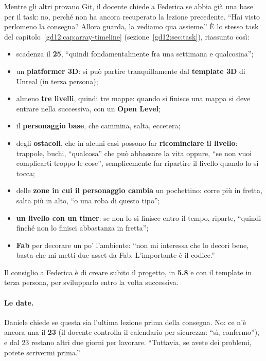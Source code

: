Mentre gli altri provano Git, il docente chiede a Federica se abbia già una base
per il task: no, perché non ha ancora recuperato la lezione precedente. ``Hai
visto perlomeno la consegna? Allora guarda, la vediamo qua assieme.'' È lo
stesso task del capitolo~\ref{gd12:cap:array-timeline}
(sezione~\ref{gd12:sec:task}), riassunto così:
\begin{itemize}
  \item scadenza il \textbf{25}, ``quindi fondamentalmente fra una settimana e
        qualcosina'';
  \item un \textbf{platformer 3D}: si può partire tranquillamente dal
        \textbf{template 3D} di Unreal (in terza persona);
  \item almeno \textbf{tre livelli}, quindi tre mappe: quando si finisce una
        mappa si deve entrare nella successiva, con un \textbf{Open Level};
  \item il \textbf{personaggio base}, che cammina, salta, eccetera;
  \item degli \textbf{ostacoli}, che in alcuni casi possono far
        \textbf{ricominciare il livello}: trappole, buchi, ``qualcosa'' che può
        abbassare la vita oppure, ``se non vuoi complicarti troppo le cose'',
        semplicemente far ripartire il livello quando lo si tocca;
  \item delle \textbf{zone in cui il personaggio cambia} un pochettino: corre
        più in fretta, salta più in alto, ``o una roba di questo tipo'';
  \item \textbf{un livello con un timer}: se non lo si finisce entro il tempo,
        riparte, ``quindi finché non lo finisci abbastanza in fretta'';
  \item \textbf{Fab} per decorare un po' l'ambiente: ``non mi interessa che lo
        decori bene, basta che mi metti due asset da Fab. L'importante è il
        codice.''
\end{itemize}
Il consiglio a Federica è di creare subito il progetto, in \textbf{5.8} e con il
template in terza persona, per svilupparlo entro la volta successiva.

\paragraph{Le date.} Daniele chiede se questa sia l'ultima lezione prima della
consegna. No: ce n'è ancora una il \textbf{23} (il docente controlla il
calendario per sicurezza: ``sì, confermo''), e dal 23 restano altri due giorni
per lavorare. ``Tuttavia, se avete dei problemi, potete scrivermi prima.''

